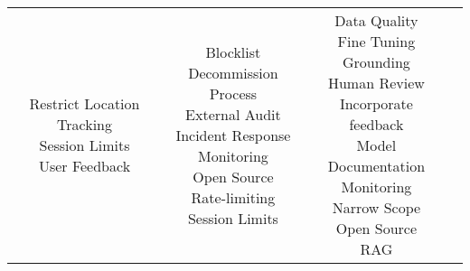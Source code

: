 \documentclass[fleqn]{article}
\begin{document}
\begin{landscape}
\begin{table}[H]
\begin{tabular}{|c|c|c|c|}
{			\textbullet\hspace{3pt} Restrict Location Tracking\\  		
			\textbullet\hspace{3pt} Session Limits\\ 
			\textbullet\hspace{3pt} User Feedback\\ 		 	 	 
		}
		& \makecell[l]{
			\textbullet\hspace{3pt} Blocklist \\ 	
			\textbullet\hspace{3pt} Decommission Process\\ 	
			\textbullet\hspace{3pt} External Audit\\ 
			\textbullet\hspace{3pt} Incident Response\\  
			\textbullet\hspace{3pt} Monitoring\\ 	
			\textbullet\hspace{3pt} Open Source\\
			\textbullet\hspace{3pt} Rate-limiting \\ 
			\textbullet\hspace{3pt} Session Limits\\ 				 	 
		}
		& \makecell[l]{
			\textbullet\hspace{3pt} Data Quality\\ 
			\textbullet\hspace{3pt} Fine Tuning\\ 	
			\textbullet\hspace{3pt} Grounding\\ 	
			\textbullet\hspace{3pt} Human Review \\ 	
			\textbullet\hspace{3pt} Incorporate feedback \\
			\textbullet\hspace{3pt} Model Documentation \\ 	
			\textbullet\hspace{3pt} Monitoring\\ 	
			\textbullet\hspace{3pt} Narrow Scope\\ 	
			\textbullet\hspace{3pt} Open Source\\ 	
			\textbullet\hspace{3pt} RAG\\ 	
}
\end{tabular}
\end{table}
\end{landscape}
\end{document}

